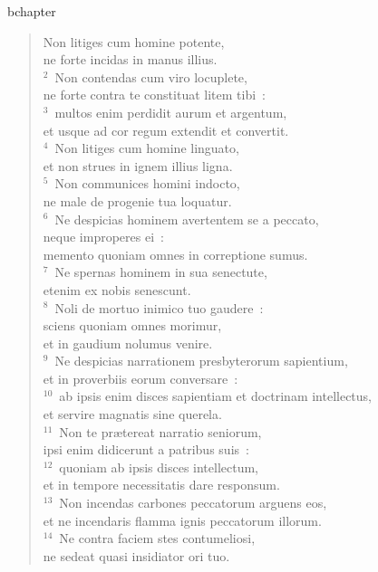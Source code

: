 bchapter\begin{verse}\vspace{-19pt}Non litiges cum homine potente,\\ ne forte incidas in manus illius.\\
${}^{2}$~Non contendas cum viro locuplete,\\ ne forte contra te constituat litem tibi~:\\
${}^{3}$~multos enim perdidit aurum et argentum,\\ et usque ad cor regum extendit et convertit.\\
${}^{4}$~Non litiges cum homine linguato,\\ et non strues in ignem illius ligna.\\
${}^{5}$~Non communices homini indocto,\\ ne male de progenie tua loquatur.\\
${}^{6}$~Ne despicias hominem avertentem se a peccato,\\ neque improperes ei~:\\ memento quoniam omnes in correptione sumus.\\
${}^{7}$~Ne spernas hominem in sua senectute,\\ etenim ex nobis senescunt.\\
${}^{8}$~Noli de mortuo inimico tuo gaudere~:\\ sciens quoniam omnes morimur,\\ et in gaudium nolumus venire.\\
${}^{9}$~Ne despicias narrationem presbyterorum sapientium,\\ et in proverbiis eorum conversare~:\\
${}^{10}$~ab ipsis enim disces sapientiam et doctrinam intellectus,\\ et servire magnatis sine querela.\\
${}^{11}$~Non te pr\ae tereat narratio seniorum,\\ ipsi enim didicerunt a patribus suis~:\\
${}^{12}$~quoniam ab ipsis disces intellectum,\\ et in tempore necessitatis dare responsum.\\
${}^{13}$~Non incendas carbones peccatorum arguens eos,\\ et ne incendaris flamma ignis peccatorum illorum.\\
${}^{14}$~Ne contra faciem stes contumeliosi,\\ ne sedeat quasi insidiator ori tuo.\\

\end{verse}
